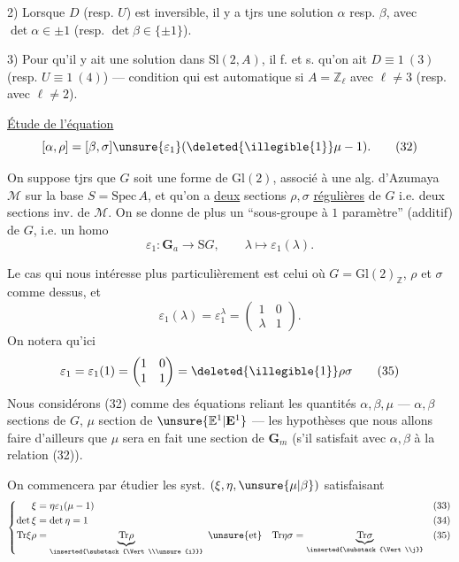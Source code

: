 2) Lorsque $D$ (resp. $U$) est inversible, il y a tjrs une solution $\alpha$ resp. $\beta$, avec $\det\alpha\in\pm1$ (resp. $\det\beta\in\{\pm1\}$).

3) Pour qu'il y ait une solution dans $\mathrm{Sl}(2,A)$, il f. et s. qu'on ait $D\equiv1\ (3)$ (resp. $U\equiv1\ (4)$) --- condition qui est automatique si $A=\mathbb{Z}_\ell$ avec $\ell\ne3$ (resp. avec $\ell\ne2$).

 \uline{Étude  de l'équation}
\[
[\alpha,\rho]=[\beta,\sigma]\unsure{\varepsilon_1}(\deleted{\illegible{1}}\mu-1). \tag{32}
\]

On suppose tjrs que $G$ soit une forme de $\mathrm{Gl}(2)$, associé à une alg. d'Azumaya $\mathcal M$ sur la base $S=\mathrm{Spec}\,A$, et qu'on a \uline{deux} sections $\rho,\sigma$ \uline{régulières} de $G$ i.e. deux sections inv. de $\mathcal M$. On se donne de plus un ``sous-groupe à $1$ paramètre'' (additif) de $G$, i.e. un homo
\[
\varepsilon_1:\mathbf G_a\longrightarrow \mathrm{S}G,\qquad \lambda\longmapsto\varepsilon_1(\lambda). \tag{33}
\]


Le cas qui nous intéresse plus particulièrement est celui où $G=\mathrm{Gl}(2)_{\mathbb{Z}}$, $\rho$ et $\sigma$ comme dessus, et
\[
\varepsilon_1(\lambda)=\varepsilon_1^\lambda=\begin{pmatrix}1&0\\\lambda&1\end{pmatrix}. \tag{34}
\]
On notera qu'ici
\[
\varepsilon_1=\varepsilon_1(1)=\begin{pmatrix}1&0\\1&1\end{pmatrix}=\deleted{\illegible{1}}\rho\sigma \tag{35}
\]
Nous considérons (32) comme des équations reliant les quantités $\alpha,\beta,\mu$ --- $\alpha,\beta$ sections  de $G$, $\mu$ section de $\unsure{\mathbb E^1|\mathbf E^1}$ --- les hypothèses que nous allons faire  d'ailleurs que $\mu$ sera en fait une section de $\mathbf G_m$ (s'il satisfait avec $\alpha,\beta$ à la relation (32)). 

On commencera par étudier les syst.  $(\xi,\eta,\unsure{\mu|\beta})$ satisfaisant
\[
\left\{\begin{aligned}
\xi&=\eta\varepsilon_1(\mu-1) && (33)\\
\det\xi&=\det\eta=1 && (34)\\
\mathrm{Tr}\xi\rho&=\underbrace{\mathrm{Tr}\rho}_{\inserted{\substack{\Vert\\\unsure{i}}}}\ \unsure{\text{et}}\quad
\mathrm{Tr}\eta\sigma=\underbrace{\mathrm{Tr}\sigma}_{\inserted{\substack{\Vert\\j}}} && (35)
\end{aligned}\right.
\]

